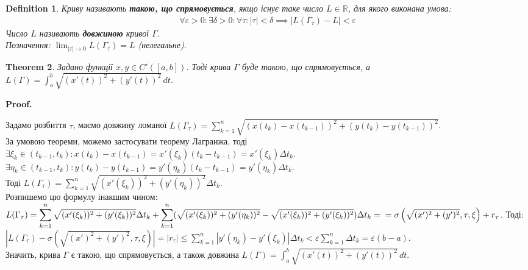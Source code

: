 \documentclass[a4paper, 10pt]{article}
\makeatletter
\def\huge{\displaystyle}
\def\qed{$\blacksquare$}
\theoremstyle{theoremdd}
\newtheorem{theorem}{Theorem}[subsection]
\theoremstyle{theoremdd}
\newtheorem{definition}[theorem]{Definition}
\theoremstyle{theoremdd}
\theoremstyle{theoremdd}
\theoremstyle{theoremdd}
\theoremstyle{theoremdd}
\theoremstyle{theoremdd}
\theoremstyle{theoremdd}
\renewenvironment{proof}[1][Proof.\\]{\par
\pushQED{\hfill \qed}%
\normalfont \topsep6\p@\@plus6\p@\relax
\trivlist
\item\relax
{\bfseries
#1\@addpunct{.}}\hspace\labelsep\ignorespaces
}{%
\popQED\endtrivlist\@endpefalse
}
\makeatother
\begin{document}
\begin{definition}
Криву називають \textbf{такою, що спрямовується}, якщо існує таке число $L \in \mathbb{R}$, для якого виконана умова:
\begin{align*}
\forall \varepsilon > 0: \exists \delta > 0: \forall \tau: |\tau| < \delta \implies |L(\Gamma_\tau) -L| < \varepsilon
\end{align*}
Число $L$ називають \textbf{довжиною} кривої $\Gamma$.\\
Позначення: $\huge\lim_{|\tau| \to 0} L(\Gamma_\tau) = L$ (нелегальне).
\end{definition}

\begin{theorem}
Задано функції $x,y \in C'([a,b])$. Тоді крива $\Gamma$ буде такою, що спрямовується, а $L(\Gamma) = \huge\int_a^b \sqrt{(x'(t))^2 + (y'(t))^2}\,dt$.
\end{theorem}

\begin{proof}
Задамо розбиття $\tau$, маємо довжину ломаної $L(\Gamma_{\tau}) = \huge\sum_{k=1}^n \sqrt{(x(t_{k})-x(t_{k-1}))^2 + (y(t_{k})-y(t_{k-1}))^2}$.\\
За умовою теореми, можемо застосувати теорему Лагранжа, тоді\\
$\exists \xi_k \in (t_{k-1},t_k): x(t_{k})-x(t_{k-1}) = x'(\xi_k) (t_{k}-t_{k-1}) = x'(\xi_k) \Delta t_k$.\\
$\exists \eta_k \in (t_{k-1},t_k): y(t_{k})-y(t_{k-1}) = y'(\eta_k) (t_k-t_{k-1}) = y'(\eta_k) \Delta t_k$.\\
Тоді $L(\Gamma_\tau) = \huge\sum_{k=1}^n \sqrt{(x'(\xi_k))^2 + (y'(\eta_k))^2} \Delta t_k$.\\
Розпишемо цю формулу інакшим чином:\\
$L(\Gamma_\tau) = \huge\sum_{k=1}^n \sqrt{(x'(\xi_k))^2 + (y'(\xi_k))^2} \Delta t_k + \huge\sum_{k=1}^n (\sqrt{(x'(\xi_k))^2 + (y'(\eta_k))^2} - \sqrt{(x'(\xi_k))^2 + (y'(\xi_k))^2}) \Delta t_k = \\ = \sigma \left(\sqrt{(x')^2+(y')^2}, \tau, \xi \right) + r_\tau$. Тоді:\\
$|L(\Gamma_\tau) - \sigma \left(\sqrt{(x')^2+(y')^2}, \tau, \xi \right)| = |r_\tau| \leq \huge\sum_{k=1}^n |y'(\eta_k) - y'(\xi_k)| \Delta t_k < \varepsilon \huge\sum_{k=1}^n \Delta t_k = \varepsilon (b-a)$.\\
Значить, крива $\Gamma$ є такою, що спрямовується, а також довжина
$L(\Gamma) = \huge\int_a^b \sqrt{(x'(t))^2 + (y'(t))^2}\,dt$.
\end{proof}
\end{document}
